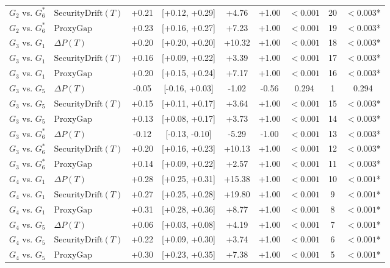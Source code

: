 \documentclass[conference]{IEEEtran}
\begin{document}
\begin{table}[t]
\begin{tabular}{llccccccc}
$G_2$ vs. $G_6^*$ & $\text{SecurityDrift}(T)$ & +0.21 & [+0.12, +0.29] & +4.76 & +1.00 & $<0.001$ & 20 & \textbf{$<0.003$}* \\
$G_2$ vs. $G_6^*$ & $\text{ProxyGap}$ & +0.23 & [+0.16, +0.27] & +7.23 & +1.00 & $<0.001$ & 19 & \textbf{$<0.003$}* \\
$G_3$ vs. $G_1$ & $\Delta P(T)$ & +0.20 & [+0.20, +0.20] & +10.32 & +1.00 & $<0.001$ & 18 & \textbf{$<0.003$}* \\
$G_3$ vs. $G_1$ & $\text{SecurityDrift}(T)$ & +0.16 & [+0.09, +0.22] & +3.39 & +1.00 & $<0.001$ & 17 & \textbf{$<0.003$}* \\
$G_3$ vs. $G_1$ & $\text{ProxyGap}$ & +0.20 & [+0.15, +0.24] & +7.17 & +1.00 & $<0.001$ & 16 & \textbf{$<0.003$}* \\
$G_3$ vs. $G_5$ & $\Delta P(T)$ & -0.05 & [-0.16, +0.03] & -1.02 & -0.56 & 0.294 & 1 & 0.294 \\
$G_3$ vs. $G_5$ & $\text{SecurityDrift}(T)$ & +0.15 & [+0.11, +0.17] & +3.64 & +1.00 & $<0.001$ & 15 & \textbf{$<0.003$}* \\
$G_3$ vs. $G_5$ & $\text{ProxyGap}$ & +0.13 & [+0.08, +0.17] & +3.73 & +1.00 & $<0.001$ & 14 & \textbf{$<0.003$}* \\
$G_3$ vs. $G_6^*$ & $\Delta P(T)$ & -0.12 & [-0.13, -0.10] & -5.29 & -1.00 & $<0.001$ & 13 & \textbf{$<0.003$}* \\
$G_3$ vs. $G_6^*$ & $\text{SecurityDrift}(T)$ & +0.20 & [+0.16, +0.23] & +10.13 & +1.00 & $<0.001$ & 12 & \textbf{$<0.003$}* \\
$G_3$ vs. $G_6^*$ & $\text{ProxyGap}$ & +0.14 & [+0.09, +0.22] & +2.57 & +1.00 & $<0.001$ & 11 & \textbf{$<0.003$}* \\
$G_4$ vs. $G_1$ & $\Delta P(T)$ & +0.28 & [+0.25, +0.31] & +15.38 & +1.00 & $<0.001$ & 10 & \textbf{$<0.001$}* \\
$G_4$ vs. $G_1$ & $\text{SecurityDrift}(T)$ & +0.27 & [+0.25, +0.28] & +19.80 & +1.00 & $<0.001$ & 9 & \textbf{$<0.001$}* \\
$G_4$ vs. $G_1$ & $\text{ProxyGap}$ & +0.31 & [+0.28, +0.36] & +8.77 & +1.00 & $<0.001$ & 8 & \textbf{$<0.001$}* \\
$G_4$ vs. $G_5$ & $\Delta P(T)$ & +0.06 & [+0.03, +0.08] & +4.19 & +1.00 & $<0.001$ & 7 & \textbf{$<0.001$}* \\
$G_4$ vs. $G_5$ & $\text{SecurityDrift}(T)$ & +0.22 & [+0.09, +0.30] & +3.74 & +1.00 & $<0.001$ & 6 & \textbf{$<0.001$}* \\
$G_4$ vs. $G_5$ & $\text{ProxyGap}$ & +0.30 & [+0.23, +0.35] & +7.38 & +1.00 & $<0.001$ & 5 & \textbf{$<0.001$}* \\

\end{tabular}
\end{table}
\end{document}
